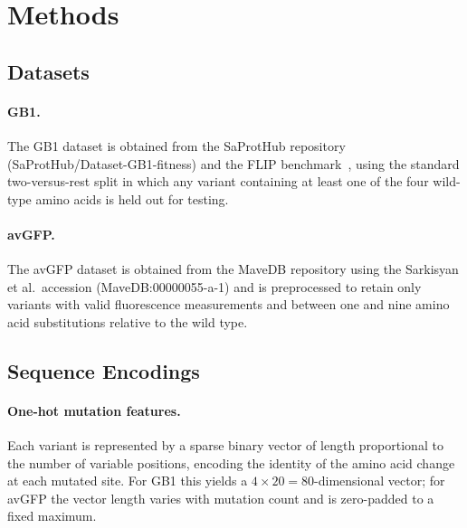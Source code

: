 \documentclass[english, 12pt, a4paper, elec, utf8, a-2b, online]{aaltothesis}
\begin{document}
\clearpage

\section{Methods}
\label{sec:methods}
\thispagestyle{empty}

\subsection{Datasets}
\label{sec:methods:data}

\paragraph{GB1.}
The GB1 dataset is obtained from the SaProtHub repository (SaProtHub/Dataset-GB1-fitness)
and the FLIP benchmark~\cite{Dallago2021FLIP}, using the standard two-versus-rest split
in which any variant containing at least one of the four wild-type amino acids is held out
for testing.

\paragraph{avGFP.}
The avGFP dataset is obtained from the MaveDB repository using the Sarkisyan et al.\
accession (MaveDB:00000055-a-1) and is preprocessed to retain only
variants with valid fluorescence measurements and between one and nine amino acid substitutions
relative to the wild type.

\subsection{Sequence Encodings}
\label{sec:methods:encodings}

\paragraph{One-hot mutation features.}
Each variant is represented by a sparse binary vector of length proportional to the number
of variable positions, encoding the identity of the amino acid change at each mutated site.
For GB1 this yields a $4 \times 20 = 80$-dimensional vector; for avGFP the vector length
varies with mutation count and is zero-padded to a fixed maximum.
\end{document}
